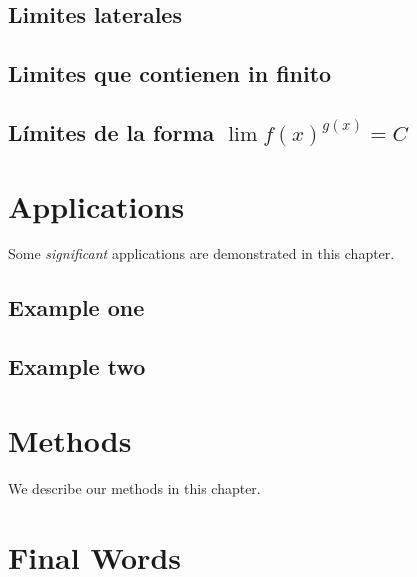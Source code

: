 \documentclass[12pt,]{krantz}
\theoremstyle{definition}
\theoremstyle{definition}
\theoremstyle{definition}
\theoremstyle{remark}
\begin{document}
\hypertarget{limites-laterales}{%
\section{Limites laterales}\label{limites-laterales}}

\hypertarget{limites-que-contienen-in-finito}{%
\section{Limites que contienen in finito}\label{limites-que-contienen-in-finito}}

\hypertarget{luxedmites-de-la-forma-lim-fxgxc}{%
\section{\texorpdfstring{Límites de la forma \(\lim f(x)^{g(x)}=C\)}{Límites de la forma \textbackslash{}lim f(x)\^{}\{g(x)\}=C}}\label{luxedmites-de-la-forma-lim-fxgxc}}

\hypertarget{applications}{%
\chapter{Applications}\label{applications}}

Some \emph{significant} applications are demonstrated in this chapter.

\hypertarget{example-one}{%
\section{Example one}\label{example-one}}

\hypertarget{example-two}{%
\section{Example two}\label{example-two}}

\hypertarget{methods}{%
\chapter{Methods}\label{methods}}

We describe our methods in this chapter.

\hypertarget{appendix-apendice}{%
\appendix {}}


\hypertarget{final-words}{%
\chapter{Final Words}\label{final-words}}
\end{document}
